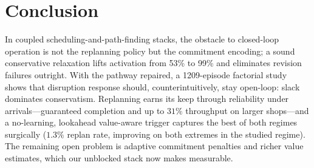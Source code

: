 \documentclass[twocolumn]{article}
\begin{document}
\section{Conclusion}
In coupled scheduling-and-path-finding stacks, the obstacle to
closed-loop operation is not the replanning policy but the commitment
encoding; a sound conservative relaxation lifts activation from 53\% to
99\% and eliminates revision failures outright. With the pathway
repaired, a 1209-episode factorial study shows that disruption response
should, counterintuitively, stay open-loop: slack dominates
conservatism. Replanning earns its keep through reliability under
arrivals---guaranteed completion and up to $31\%$ throughput on larger
shops---and a no-learning, lookahead value-aware trigger captures the
best of both regimes surgically ($1.3\%$ replan rate, improving on both
extremes in the studied regime). The remaining open problem is adaptive
commitment penalties and richer value estimates, which our unblocked
stack now makes measurable.



\end{document}
